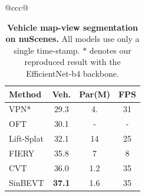 \documentclass{article}
\begin{document}
{\begin{table}[!t]
\begin{tabular}{@{}ccc@{}}
\begin{minipage}[t]{0.29\textwidth}
\centering
\setlength{\tabcolsep}{2pt}
\renewcommand{\arraystretch}{1.1}
\caption{\textbf{Vehicle map-view segmentation on nuScenes.} All models use only a single time-stamp. $*$ denotes our reproduced result with the EfficientNet-b4 backbone.}
\label{tab:nuscene}
\begin{tabular}{l|ccc}
\cellcolor{lightgray}Method & \cellcolor{lightgray}Veh. & \cellcolor{lightgray}Par(M) & \cellcolor{lightgray}FPS \\
\toprule
VPN*~\cite{pan2020cross}        & 29.3  & 4.           & 31   \\
OFT~\cite{roddick2018orthographic}       & 30.1    & -            & -   \\
Lift-Splat & 32.1    & 14           & 25  \\
FIERY~\cite{hu2021fiery}      & 35.8    & 7            & 8   \\
CVT~\cite{zhou2022cross}        & 36.0    & 1.2            & 35  \\ \hline
SinBEVT & \textbf{37.1}    & 1.6           & 35  \\ 
\end{tabular}
\end{minipage}
\end{tabular}
\end{table}




}
\end{document}
